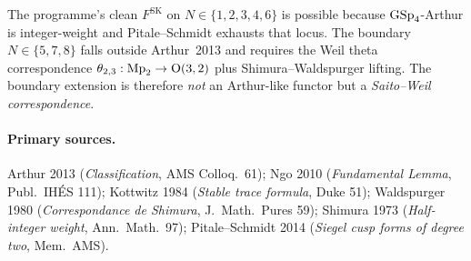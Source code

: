 The programme's clean $F^{\mathrm{SK}}$ on $N \in \{1, 2, 3, 4, 6\}$
is possible because $\mathrm{GSp}_4$-Arthur is integer-weight and
Pitale--Schmidt exhausts that locus.  The boundary $N \in \{5, 7, 8\}$
falls outside Arthur~2013 and requires the Weil theta correspondence
$\theta_{2,3}: \mathrm{Mp}_2 \to \mathrm{O}(3, 2)$ plus Shimura--Waldspurger
lifting.  The boundary extension is therefore \emph{not} an
Arthur-like functor but a \emph{Saito--Weil correspondence}.

\paragraph{Primary sources.}
Arthur 2013 (\emph{Classification}, AMS Colloq.\ 61);
Ngo 2010 (\emph{Fundamental Lemma}, Publ.\ IH\'ES 111);
Kottwitz 1984 (\emph{Stable trace formula}, Duke 51);
Waldspurger 1980 (\emph{Correspondance de Shimura}, J.\ Math.\ Pures 59);
Shimura 1973 (\emph{Half-integer weight}, Ann.\ Math.\ 97);
Pitale--Schmidt 2014 (\emph{Siegel cusp forms of degree two}, Mem.\ AMS).
